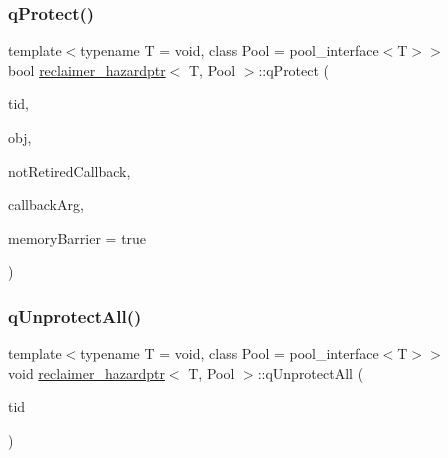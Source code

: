 \subsubsection{\texorpdfstring{q\+Protect()}{qProtect()}}
{\footnotesize\ttfamily template$<$typename T  = void, class Pool  = pool\+\_\+interface$<$\+T$>$$>$ \\
bool \hyperlink{classreclaimer__hazardptr}{reclaimer\+\_\+hazardptr}$<$ T, Pool $>$\+::q\+Protect (\begin{DoxyParamCaption}\item[{const int}]{tid,  }\item[{T $\ast$const}]{obj,  }\item[{\hyperlink{globals_8h_a57f5c0d40b156d7d996492fb2f16e3cd}{Callback\+Type}}]{not\+Retired\+Callback,  }\item[{\hyperlink{globals_8h_a3de64ef48066ac6430631c8b81a15345}{Callback\+Arg}}]{callback\+Arg,  }\item[{bool}]{memory\+Barrier = {\ttfamily true} }\end{DoxyParamCaption})\hspace{0.3cm}{\ttfamily [inline]}}

\mbox{\label{classreclaimer__hazardptr_a59e40ae1ae020e6d025be4217b68f184}} 
\subsubsection{\texorpdfstring{q\+Unprotect\+All()}{qUnprotectAll()}}
{\footnotesize\ttfamily template$<$typename T  = void, class Pool  = pool\+\_\+interface$<$\+T$>$$>$ \\
void \hyperlink{classreclaimer__hazardptr}{reclaimer\+\_\+hazardptr}$<$ T, Pool $>$\+::q\+Unprotect\+All (\begin{DoxyParamCaption}\item[{const int}]{tid }\end{DoxyParamCaption})\hspace{0.3cm}{\ttfamily [inline]}}

\mbox{\label{classreclaimer__hazardptr_aecf56d8e41ea3da3c3a5aa6ec2aad0f0}} 
